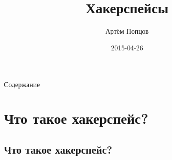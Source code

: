 \documentclass[presentation]{beamer}
\author{Артём Попцов}
\date{2015-04-26}
\title{Хакерспейсы}
\begin{document}
\maketitle

\begin{frame}{Содержание}

\setcounter{tocdepth}{1}
\tableofcontents
\end{frame}

\section{Что такое хакерспейс?}

\label{sec-1}
\subsection{Что такое хакерспейс?}

\label{sec-1-1}
\end{document}
